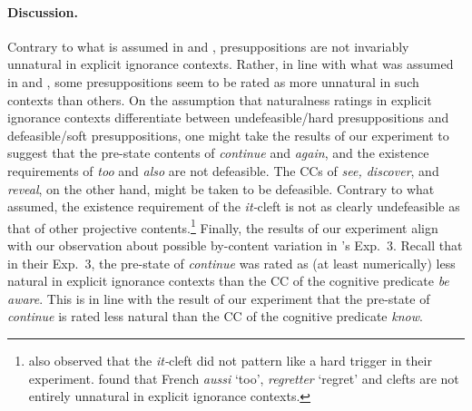 \documentclass[11pt,fleqn]{article}
\newcommand{\6}{\mbox{$[\hspace*{-.6mm}[$}}
\newcommand{\9}{\mbox{$]\hspace*{-.6mm}]$}}
\newcommand{\citepos}[1]{\citeauthor{#1}'s \citeyear{#1}}
\begin{document}
\paragraph{Discussion.} Contrary to what is assumed in \citealt{mandelkern-etal2020} and \citealt{kalomoiros-schwarz2021,kalomoiros-schwarz-JoS}, presuppositions are not invariably unnatural in explicit ignorance contexts. Rather, in line with what was assumed in \citealt{simons01} and \citealt{abusch10}, some presuppositions seem to be rated as more unnatural in such contexts than others. On the assumption that naturalness ratings in explicit ignorance contexts differentiate between undefeasible/hard presuppositions and defeasible/soft presuppositions, one might take the results of our experiment to suggest that the pre-state contents of {\em continue} and {\em again}, and the existence requirements of {\em too} and {\em also} are not defeasible. The CCs of {\em see, discover}, and {\em reveal}, on the other hand, might be taken to be defeasible. Contrary to what \citealt{abusch10} assumed, the existence requirement of the {\em it-}cleft is not as clearly undefeasible as that of other projective contents.\footnote{\citealt{smith-hall11} also observed that the {\em it-}cleft did not pattern like a hard trigger in their experiment. \citealt{jayez-etal2015} found that French {\em aussi} `too', {\em regretter} `regret' and clefts are not entirely unnatural in explicit ignorance contexts.} Finally, the results of our experiment align with our observation about possible by-content variation in \citepos{mandelkern-etal2020} Exp.~3. Recall that in their Exp.~3, the pre-state of {\em continue} was rated as (at least numerically) less natural in explicit ignorance contexts than the CC of the cognitive predicate {\em be aware}. This is in line with the result of our experiment that the pre-state of {\em continue} is rated less natural than the CC of the cognitive predicate {\em know}.

\color{blue}
\end{document}
